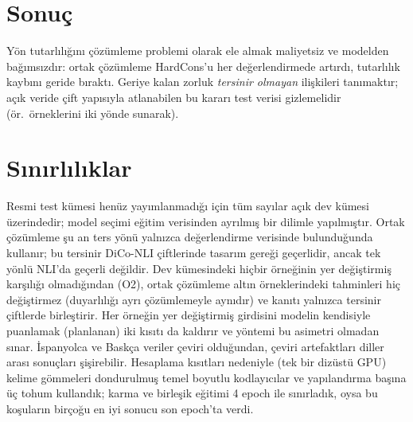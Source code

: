 

\section{Sonuç}

Yön tutarlılığını çözümleme problemi olarak ele almak maliyetsiz ve modelden bağımsızdır: ortak çözümleme HardCons'u her değerlendirmede artırdı, tutarlılık kaybını geride bıraktı. Geriye kalan zorluk \emph{tersinir olmayan} ilişkileri tanımaktır; açık veride çift yapısıyla atlanabilen bu kararı test verisi gizlemelidir (ör.\ \NO örneklerini iki yönde sunarak).

\section*{Sınırlılıklar}
Resmi test kümesi henüz yayımlanmadığı için tüm sayılar açık dev kümesi üzerindedir; model seçimi eğitim verisinden ayrılmış bir dilimle yapılmıştır. Ortak çözümleme şu an ters yönü yalnızca değerlendirme verisinde bulunduğunda kullanır; bu tersinir DiCo-NLI çiftlerinde tasarım gereği geçerlidir, ancak tek yönlü NLI'da geçerli değildir. Dev kümesindeki hiçbir \NO örneğinin yer değiştirmiş karşılığı olmadığından (O2), ortak çözümleme altın \NO örneklerindeki tahminleri hiç değiştirmez (\NO duyarlılığı ayrı çözümlemeyle aynıdır) ve kanıtı yalnızca tersinir çiftlerde birleştirir. Her örneğin yer değiştirmiş girdisini modelin kendisiyle puanlamak (planlanan) iki kısıtı da kaldırır ve yöntemi bu asimetri olmadan sınar. İspanyolca ve Baskça veriler çeviri olduğundan, çeviri artefaktları diller arası sonuçları şişirebilir. Hesaplama kısıtları nedeniyle (tek bir dizüstü GPU) kelime gömmeleri dondurulmuş temel boyutlu kodlayıcılar ve yapılandırma başına üç tohum kullandık; karma ve birleşik eğitimi 4 epoch ile sınırladık, oysa bu koşuların birçoğu en iyi sonucu son epoch'ta verdi.
